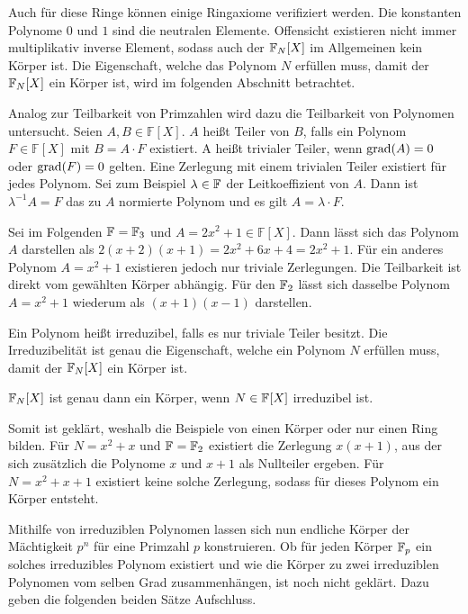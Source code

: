 Auch für diese Ringe können einige Ringaxiome verifiziert werden. Die konstanten Polynome $0$ und $1$ sind die neutralen Elemente. Offensicht existieren nicht immer multiplikativ inverse Element, sodass auch der $\field{N} {[X]}$ im Allgemeinen kein Körper ist. Die Eigenschaft, welche das Polynom $N$ erfüllen muss, damit der $\field{N} {[X]}$ ein Körper ist, wird im folgenden Abschnitt betrachtet.

Analog zur Teilbarkeit von Primzahlen wird dazu die Teilbarkeit von Polynomen untersucht. Seien $A,B \in \mathbb{F} {[X]}$. $A$ heißt Teiler von $B$, falls ein Polynom $F \in \mathbb{F} {[X]}$ mit $B = A \cdot F$ existiert. A heißt trivialer Teiler, wenn $\mathrm{grad}(A) = 0$ oder $\mathrm{grad}(F) = 0$ gelten. Eine Zerlegung mit einem trivialen Teiler existiert für jedes Polynom. Sei zum Beispiel $\lambda \in \field{}$  der Leitkoeffizient von $A$. Dann ist $\lambda^{-1}A = F$ das zu $A$ normierte Polynom und es gilt $A = \lambda\cdot F$.

Sei im Folgenden $\field{} = \field{3}$ und $A=2x^2 + 1 \in \mathbb{F} {[X]}$. Dann lässt sich das Polynom $A$ darstellen als $2(x+2)(x+1) = 2x^2 + 6x + 4 = 2x^2 + 1$. Für ein anderes Polynom $A=x^2 + 1$ existieren jedoch nur triviale Zerlegungen. Die Teilbarkeit ist direkt vom gewählten Körper abhängig. Für den $\field{2}$ lässt sich dasselbe Polynom $A=x^2 + 1$ wiederum als $(x+1)(x-1)$ darstellen.

Ein Polynom heißt irreduzibel, falls es nur triviale Teiler besitzt. Die Irreduzibelität ist genau die Eigenschaft, welche ein Polynom $N$ erfüllen muss, damit der $\field{N} {[X]}$ ein Körper ist. 

\begin{satz}
    $\field{N} {[X]}$ ist genau dann ein Körper, wenn $N \in \field{}{[X]}$ irreduzibel ist.
\end{satz}

Somit ist geklärt, weshalb die Beispiele von  einen Körper oder nur einen Ring bilden. Für $N=x^2 + x$ und $\field{} = \field{2}$ existiert die Zerlegung $x(x+1)$, aus der sich zusätzlich die Polynome $x$ und $x+1$ als Nullteiler ergeben. Für $N=x^2 + x + 1$ existiert keine solche Zerlegung, sodass für dieses Polynom ein Körper entsteht.

Mithilfe von irreduziblen Polynomen lassen sich nun endliche Körper der Mächtigkeit $p^n$ für eine Primzahl $p$ konstruieren. Ob für jeden Körper $\field{p}$ ein solches irreduzibles Polynom existiert und wie die Körper zu zwei irreduziblen Polynomen vom selben Grad zusammenhängen, ist noch nicht geklärt. Dazu geben die folgenden beiden Sätze Aufschluss.

